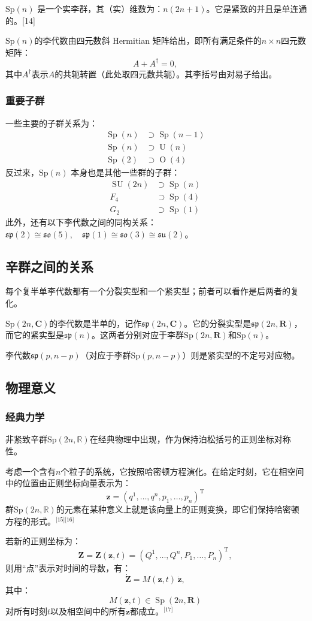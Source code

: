 $\mathrm{Sp}(n)$ 是一个实李群，其（实）维数为：$n(2n+1)$。它是紧致的并且是单连通的。[14]

$\mathrm{Sp}(n)$的李代数由四元数斜 Hermitian 矩阵给出，即所有满足条件的$n \times n$四元数矩阵：
$$
A + A^{\dagger} = 0,~
$$
其中$A^{\dagger}$表示$A$的共轭转置（此处取四元数共轭）。其李括号由对易子给出。
\subsubsection{重要子群}
一些主要的子群关系为：
$$
\begin{aligned}
\operatorname{Sp}(n) &\supset \operatorname{Sp}(n-1)\\
\operatorname{Sp}(n) &\supset \operatorname{U}(n)\\
\operatorname{Sp}(2) &\supset \operatorname{O}(4)
\end{aligned}~
$$
反过来，$\mathrm{Sp}(n)$ 本身也是其他一些群的子群：
$$
\begin{aligned}
\operatorname{SU}(2n) &\supset \operatorname{Sp}(n)\\
F_{4} &\supset \operatorname{Sp}(4)\\
G_{2} &\supset \operatorname{Sp}(1)
\end{aligned}~
$$
此外，还有以下李代数之间的同构关系：$\mathfrak{sp}(2) \cong \mathfrak{so}(5), \quad\mathfrak{sp}(1) \cong \mathfrak{so}(3) \cong \mathfrak{su}(2)$。
\subsection{辛群之间的关系}
每个复半单李代数都有一个分裂实型和一个紧实型；前者可以看作是后两者的复化。

$\mathrm{Sp}(2n, \mathbf{C})$的李代数是半单的，记作$\mathfrak{sp}(2n, \mathbf{C})$。它的分裂实型是$\mathfrak{sp}(2n, \mathbf{R})$，而它的紧实型是$\mathfrak{sp}(n)$。这两者分别对应于李群$\mathrm{Sp}(2n, \mathbf{R})$和$\mathrm{Sp}(n)$。

李代数$\mathfrak{sp}(p, n-p)$（对应于李群$\mathrm{Sp}(p, n-p)$）则是紧实型的不定号对应物。
\subsection{物理意义}
\subsubsection{经典力学}
非紧致辛群$\mathrm{Sp}(2n, \mathbb{R})$在经典物理中出现，作为保持泊松括号的正则坐标对称性。

考虑一个含有$n$个粒子的系统，它按照哈密顿方程演化。在给定时刻，它在相空间中的位置由正则坐标向量表示为：
$$
\mathbf{z} = (q^{1}, \ldots, q^{n}, p_{1}, \ldots, p_{n})^{\mathrm{T}}~
$$
群$\mathrm{Sp}(2n, \mathbb{R})$的元素在某种意义上就是该向量上的正则变换，即它们保持哈密顿方程的形式。\(^\text{[15][16]}\)

若新的正则坐标为：
$$
\mathbf{Z} = \mathbf{Z}(\mathbf{z}, t) = (Q^{1}, \ldots, Q^{n}, P_{1}, \ldots, P_{n})^{\mathrm{T}},~
$$
则用“点”表示对时间的导数，有：
$$
\dot{\mathbf{Z}} = M(\mathbf{z}, t) \, \dot{\mathbf{z}},~
$$
其中：
$$
M(\mathbf{z}, t) \in \operatorname{Sp}(2n, \mathbf{R})~
$$
对所有时刻$t$以及相空间中的所有$\mathbf{z}$都成立。\(^\text{[17]}\)
